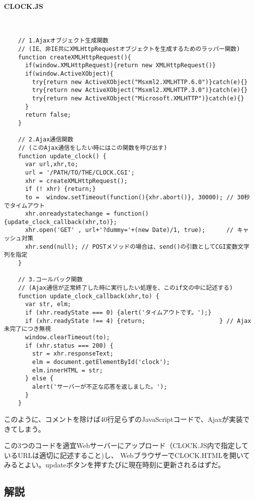 \paragraph{CLOCK.JS} 　\\
\begin{frameboxit}{160.0mm}
\begin{verbatim}
	// 1.Ajaxオブジェクト生成関数
	// (IE、非IE共にXMLHttpRequestオブジェクトを生成するためのラッパー関数)
	function createXMLHttpRequest(){
	  if(window.XMLHttpRequest){return new XMLHttpRequest()}
	  if(window.ActiveXObject){
	    try{return new ActiveXObject("Msxml2.XMLHTTP.6.0")}catch(e){}
	    try{return new ActiveXObject("Msxml2.XMLHTTP.3.0")}catch(e){}
	    try{return new ActiveXObject("Microsoft.XMLHTTP")}catch(e){}
	  }
	  return false;
	}

	// 2.Ajax通信関数
	// (このAjax通信をしたい時にはこの関数を呼び出す)
	function update_clock() {
	  var url,xhr,to;
	  url = '/PATH/TO/THE/CLOCK.CGI';
	  xhr = createXMLHttpRequest();
	  if (! xhr) {return;}
	  to =  window.setTimeout(function(){xhr.abort()}, 30000); // 30秒でタイムアウト
	  xhr.onreadystatechange = function(){update_clock_callback(xhr,to)};
	  xhr.open('GET' , url+'?dummy='+(new Date)/1, true);      // キャッシュ対策
	  xhr.send(null); // POSTメソッドの場合は、send()の引数としてCGI変数文字列を指定
	}

	// 3.コールバック関数
	// (Ajax通信が正常終了した時に実行したい処理を、このif文の中に記述する)
	function update_clock_callback(xhr,to) {
	  var str, elm;
	  if (xhr.readyState === 0) {alert('タイムアウトです。');}
	  if (xhr.readyState !== 4) {return;                     } // Ajax未完了につき無視
	  window.clearTimeout(to);
	  if (xhr.status === 200) {
	    str = xhr.responseText;
	    elm = document.getElementById('clock');
	    elm.innerHTML = str;
	  } else {
	    alert('サーバーが不正な応答を返しました。');
	  }
	}
\end{verbatim}
\end{frameboxit}
このように、コメントを除けば40行足らずのJavaScriptコードで、Ajaxが実装できてしまう。

この3つのコードを適宜Webサーバーにアップロード（CLOCK.JS内で指定しているURLは適切に記述すること)し、
WebブラウザーでCLOCK.HTMLを開いてみるとよい。updateボタンを押すたびに現在時刻に更新されるはずだ。

\subsection*{解説}

